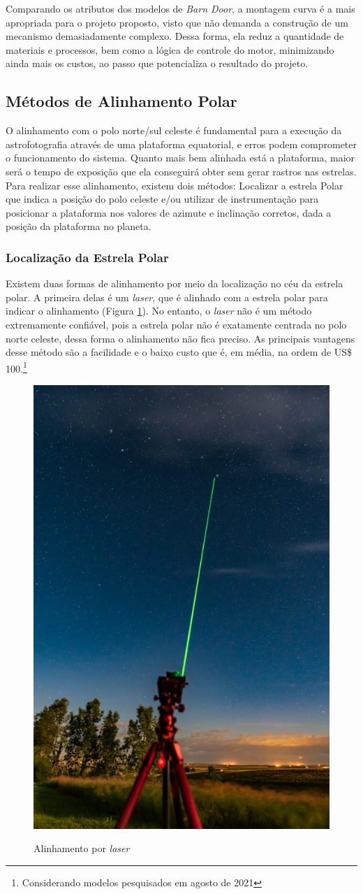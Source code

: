 Comparando os atributos dos modelos de \textit{Barn Door}, a montagem curva é a mais apropriada para o projeto proposto, visto que não demanda a construção de um mecanismo demasiadamente complexo. Dessa forma, ela reduz a quantidade de materiais e processos, bem como a lógica de controle do motor, minimizando ainda mais os custos, ao passo que potencializa o resultado do projeto. 

\subsection{Métodos de Alinhamento Polar}
O alinhamento com o polo norte/sul celeste é fundamental para a execução da astrofotografia através de uma plataforma equatorial, e erros podem comprometer o funcionamento do sistema. Quanto mais bem alinhada está a plataforma, maior será o tempo de exposição que ela conseguirá obter sem gerar rastros nas estrelas. Para realizar esse alinhamento, existem dois métodos: Localizar a estrela Polar que indica a posição do polo celeste e/ou utilizar de instrumentação para posicionar a plataforma nos valores de azimute e inclinação corretos, dada a posição da plataforma no planeta.

\subsubsection{Localização da Estrela Polar}
Existem duas formas de alinhamento por meio da localização no céu da estrela polar. A primeira delas é um \textit{laser}, que é alinhado com a estrela polar para indicar o alinhamento (Figura \ref{fig:alinhamentolaser}). No entanto, o \textit{laser} não é um método extremamente confiável, pois a estrela polar não é exatamente centrada no polo norte celeste, dessa forma o alinhamento não fica preciso. As principais vantagens desse método são a facilidade e o baixo custo que é, em média, na ordem de US\$ 100.\footnote{Considerando modelos pesquisados em agosto de 2021}

 \begin{figure}[!htb]
	\centering
	\caption{Alinhamento por \textit{laser}}
	\includegraphics[width=0.3\linewidth]{figuras/alinhamentolaser}
	\label{fig:alinhamentolaser}
\end{figure}


